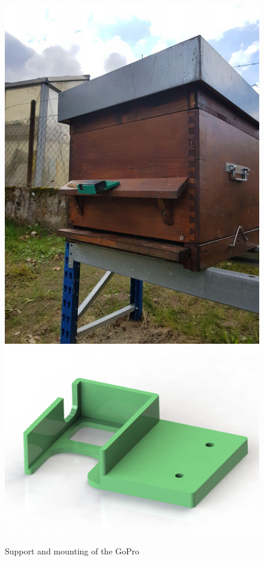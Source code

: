 \documentclass[10pt,twocolumn,letterpaper]{article}
\begin{document}
\begin{figure}[h!]
\centering
\includegraphics[scale=0.23]{pictures/photoSupport.jpg}
\includegraphics[scale=0.1]{pictures/support.jpg}
\caption{Support and mounting of the GoPro}
\end{figure}
\end{document}
